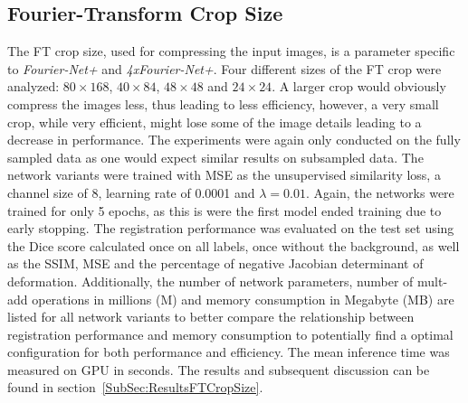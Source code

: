 \documentclass[english,version-2022-01]{uzl-thesis} %
\begin{document}
\subsection{Fourier-Transform Crop Size} \label{SubSec:FTCropSize}
The FT crop size, used for compressing the input images, is a parameter specific to \emph{Fourier-Net+} and \emph{4xFourier-Net+}. Four different sizes of the FT crop were analyzed: $80 \times 168$, $40 \times 84$, $48 \times 48$ and $24 \times 24$. A larger crop would obviously compress the images less, thus leading to less efficiency, however, a very small crop, while very efficient, might lose some of the image details leading to a decrease in performance. The experiments were again only conducted on the fully sampled data as one would expect similar results on subsampled data. The network variants were trained with MSE as the unsupervised similarity loss, a channel size of 8, learning rate of 0.0001 and $\lambda=0.01$. Again, the networks were trained for only 5 epochs, as this is were the first model ended training due to early stopping. The registration performance was evaluated on the test set using the Dice score calculated once on all labels, once without the background, as well as the SSIM, MSE and the percentage of negative Jacobian determinant of deformation. Additionally, the number of network parameters, number of mult-add operations in millions (M) and memory consumption in Megabyte (MB) are listed for all network variants to better compare the relationship between registration performance and memory consumption to potentially find a optimal configuration for both performance and efficiency. The mean inference time was measured on GPU in seconds. The results and subsequent discussion can be found in section~\ref{SubSec:ResultsFTCropSize}.
\end{document}
